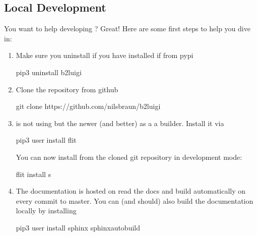 \documentclass[letterpaper,10pt,english]{sphinxmanual}
\begin{document}
\subsection{Local Development}
\label{\detokenize{advanced/development:local-development}}
You want to help developing ? Great! Here are some first steps to help you dive in:
\begin{enumerate}
%
\item {} 
Make sure you uninstall  if you have installed if from pypi

\begin{sphinxVerbatim}[commandchars=\\\{\}]
pip3 uninstall b2luigi
\end{sphinxVerbatim}

\item {} 
Clone the repository from github

\begin{sphinxVerbatim}[commandchars=\\\{\}]
git clone https://github.com/nils\PYGZhy{}braun/b2luigi
\end{sphinxVerbatim}

\item {} 
 is not using  but the newer (and better)  as a a builder.
Install it via

\begin{sphinxVerbatim}[commandchars=\\\{\}]
pip3 \PYG{o}{[} \PYGZhy{}\PYGZhy{}user \PYG{o}{]} install flit
\end{sphinxVerbatim}

You can now install  from the cloned git repository in development mode:

\begin{sphinxVerbatim}[commandchars=\\\{\}]
flit install \PYGZhy{}s
\end{sphinxVerbatim}

\item {} 
The documentation is hosted on read the docs and build automatically on every commit to master.
You can (and should) also build the documentation locally by installing 

\begin{sphinxVerbatim}[commandchars=\\\{\}]
pip3 \PYG{o}{[} \PYGZhy{}\PYGZhy{}user \PYG{o}{]} install sphinx sphinx\PYGZhy{}autobuild
\end{sphinxVerbatim}


\end{enumerate}
\end{document}
